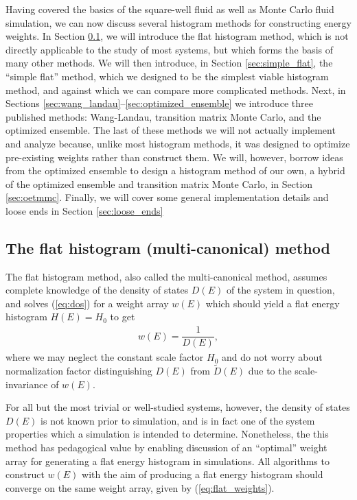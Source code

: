 \documentclass[11pt]{article}
\newcommand{\f}[2]{\dfrac{#1}{#2}} %
\newcommand{\p}[1]{\left(#1\right)} %
\begin{document}
Having covered the basics of the square-well fluid as well as Monte
Carlo fluid simulation, we can now discuss several histogram methods
for constructing energy weights. In Section \ref{sec:flat_histogram},
we will introduce the flat histogram method, which is not directly
applicable to the study of most systems, but which forms the basis of
many other methods. We will then introduce, in Section
\ref{sec:simple_flat}, the ``simple flat'' method, which we designed
to be the simplest viable histogram method, and against which we can
compare more complicated methods. Next, in Sections
\ref{sec:wang_landau}--\ref{sec:optimized_ensemble} we introduce three
published methods: Wang-Landau, transition matrix Monte Carlo, and the
optimized ensemble. The last of these methods we will not actually
implement and analyze because, unlike most histogram methods, it was
designed to optimize pre-existing weights rather than construct
them. We will, however, borrow ideas from the optimized ensemble to
design a histogram method of our own, a hybrid of the optimized
ensemble and transition matrix Monte Carlo, in Section
\ref{sec:oetmmc}. Finally, we will cover some general implementation
details and loose ends in Section \ref{sec:loose_ends}

\subsection{The flat histogram (multi-canonical) method}
\label{sec:flat_histogram}

The flat histogram method, also called the multi-canonical method,
assumes complete knowledge of the density of states $D\p{E}$ of the
system in question, and solves (\ref{eq:dos}) for a weight array
$w\p{E}$ which should yield a flat energy histogram $H\p E=H_0$ to get
\begin{align}
  w\p E=\f1{D\p E},
  \label{eq:flat_weights}
\end{align}
where we may neglect the constant scale factor $H_0$ and do not worry
about normalization factor distinguishing $D\p{E}$ from $\tilde
D\p{E}$ due to the scale-invariance of $w\p{E}$.

For all but the most trivial or well-studied systems, however, the
density of states $D\p{E}$ is not known prior to simulation, and is in
fact one of the system properties which a simulation is intended to
determine. Nonetheless, the this method has pedagogical value by
enabling discussion of an ``optimal'' weight array for generating a
flat energy histogram in simulations. All algorithms to construct
$w\p{E}$ with the aim of producing a flat energy histogram should
converge on the same weight array, given by (\ref{eq:flat_weights}).
\end{document}
